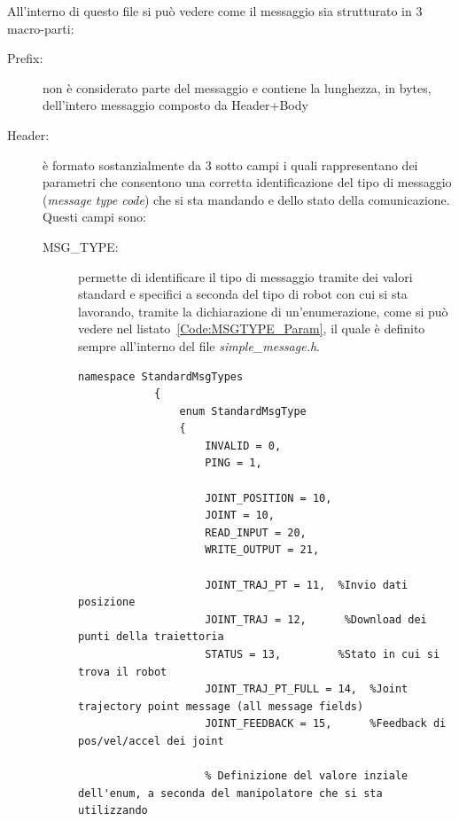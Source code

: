 All'interno di questo file si può vedere come il messaggio sia strutturato in 3 macro-parti:
\begin{description}
	\item[Prefix:] non è considerato parte del messaggio e contiene la lunghezza, in bytes, dell'intero messaggio composto da Header+Body 
	\item[Header:] è formato sostanzialmente da 3 sotto campi i quali rappresentano dei parametri che consentono una corretta identificazione del tipo di messaggio (\emph{message type code}) che si sta mandando e dello stato della comunicazione. Questi campi sono:
	\begin{description}
		\item[MSG\_TYPE: ]permette di identificare il tipo di messaggio tramite dei valori standard e specifici a seconda del tipo di robot con cui si sta lavorando, tramite la dichiarazione di un'enumerazione, come si può vedere nel listato~\vref{Code:MSGTYPE_Param}, il quale è definito sempre all'interno del file \emph{simple\_message.h}.		
		\begin{lstlisting}[style=Matlab-editor,caption=Definizione dei parametri del campo MSG\_TYPE,captionpos=b,label={Code:MSGTYPE_Param}, basicstyle=\tiny\ttfamily,frame=trBL]
			namespace StandardMsgTypes
			{
				enum StandardMsgType
				{
					INVALID = 0,
					PING = 1,
					
					JOINT_POSITION = 10,
					JOINT = 10, 
					READ_INPUT = 20,
					WRITE_OUTPUT = 21,
					
					JOINT_TRAJ_PT = 11,  %Invio dati posizione
					JOINT_TRAJ = 12,	  %Download dei punti della traiettoria
					STATUS = 13,         %Stato in cui si trova il robot
					JOINT_TRAJ_PT_FULL = 14,  %Joint trajectory point message (all message fields)
					JOINT_FEEDBACK = 15,      %Feedback di pos/vel/accel dei joint

					% Definizione del valore inziale dell'enum, a seconda del manipolatore che si sta utilizzando
					

\end{lstlisting}
\end{description}
\end{description}
